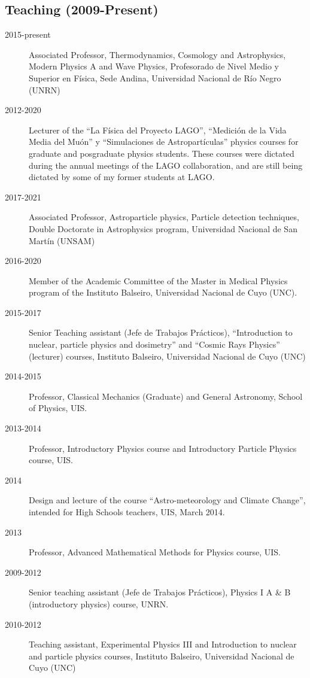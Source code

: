 \subsection*{Teaching (2009-Present)}
\begin{description}
	\item[2015-present] Associated Professor, Thermodynamics, Cosmology and Astrophysics, Modern Physics A and Wave Physics, Profesorado de Nivel Medio y Superior en Física, Sede Andina, Universidad Nacional de Río Negro (UNRN)
	\item [2012-2020] Lecturer of the ``La Física del Proyecto LAGO'', ``Medición de la Vida Media del Muón'' y ``Simulaciones de Astropartículas'' physics courses for graduate and posgraduate physics students. These courses were dictated during the annual meetings of the LAGO collaboration, and are still being dictated by some of my former students at LAGO.
	\item[2017-2021] Associated Professor, Astroparticle physics, Particle detection techniques, Double Doctorate in Astrophysics program, Universidad Nacional de San Martín (UNSAM)
	\item[2016-2020] Member of the Academic Committee of the Master in Medical Physics program of the Instituto Balseiro, Universidad Nacional de Cuyo (UNC).
	\item[2015-2017] Senior Teaching assistant (Jefe de Trabajos Prácticos), ``Introduction to nuclear, particle physics and dosimetry'' and ``Cosmic Rays Physics'' (lecturer) courses, Instituto Balseiro, Universidad Nacional de Cuyo (UNC)
	\item[2014-2015] Professor, Classical Mechanics (Graduate) and General Astronomy, School of Physics, UIS.
	\item[2013-2014] Professor, Introductory Physics course and Introductory Particle Physics course, UIS.
	\item[2014] Design and lecture of the course ``Astro-meteorology and Climate Change'', intended for High Schools teachers, UIS, March 2014.
	\item[2013] Professor, Advanced Mathematical Methods for Physics course, UIS.
	\item[2009-2012] Senior teaching assistant (Jefe de Trabajos Prácticos), Physics I A \& B (introductory physics) course, UNRN.
	\item[2010-2012] Teaching assistant, Experimental Physics III and Introduction to nuclear and particle physics courses, Instituto Balseiro, Universidad Nacional de Cuyo (UNC)
\end{description}
\else

